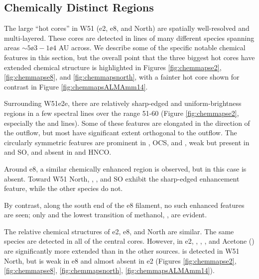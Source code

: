 \documentclass{emulateapj}
\begin{document}
\subsection{Chemically Distinct Regions}
\label{sec:chemistrymaps}
\label{sec:chemistrymapsobs}
The large ``hot cores'' in W51 (e2, e8, and North) are spatially well-resolved
and multi-layered.  These cores are detected in lines of many different species
spanning areas $\sim5\ee{3}-1\ee{4}$ AU across.  We describe some of the
specific notable chemical features in this section, but the overall point that
the three biggest hot cores have extended chemical structure is highlighted in
Figures \ref{fig:chemmapse2}, \ref{fig:chemmapse8}, and
\ref{fig:chemmapsnorth}, with a fainter hot core shown for contrast in Figure
\ref{fig:chemmapsALMAmm14}.

Surrounding W51e2e, there are relatively sharp-edged and uniform-brightness
regions in a few spectral lines over the range 51-60 \kms (Figure
\ref{fig:chemmapse2}, especially the \methanol and \methylformate lines).  Some
of these features are elongated in the direction
of the outflow, but most have significant extent orthogonal to the outflow.
The circularly symmetric features are prominent in \methanol, OCS, and
\dimethylether, weak but present in \formaldehyde and SO, and absent in
\cyanoacetylene and HNCO.

Around e8, a similar chemically enhanced region is observed, but in this case
\dimethylether is absent.  Toward W51 North, \methanol, \formaldehyde, and SO
exhibit the sharp-edged enhancement feature, while the other species do not.

By contrast, along the south end of the e8 filament, no such enhanced features
are seen; only \formaldehyde and the lowest transition of methanol, \methanol
\fourtwotwo, are evident.

The relative chemical structures of e2, e8, and North are  similar.
The same species are detected in all of the central cores.  However, in e2,
\dimethylether, \methylformate, \ethylcyanide, and Acetone (\acetone) are
significantly more extended than in the other sources.
\gaucheethanol is detected in W51 North, but is weak in e8 and almost absent
in e2 (Figures \ref{fig:chemmapse2}, \ref{fig:chemmapse8},
\ref{fig:chemmapsnorth}, \ref{fig:chemmapsALMAmm14}).
\end{document}
